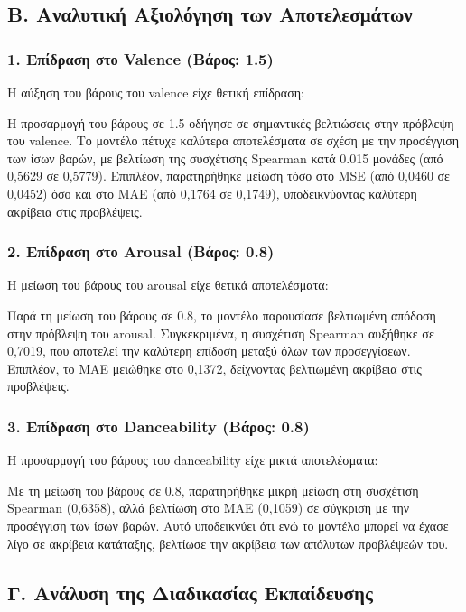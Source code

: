 \documentclass[a4paper,12pt]{article}
\begin{document}
\subsection*{Β. Αναλυτική Αξιολόγηση των Αποτελεσμάτων}

\subsubsection*{1. Επίδραση στο Valence (Βάρος: 1.5)}

Η αύξηση του βάρους του valence είχε θετική επίδραση:

Η προσαρμογή του βάρους σε 1.5 οδήγησε σε σημαντικές βελτιώσεις στην πρόβλεψη του valence. Το μοντέλο πέτυχε καλύτερα αποτελέσματα σε σχέση με την προσέγγιση των ίσων βαρών, με βελτίωση της συσχέτισης Spearman κατά 0.015 μονάδες (από 0,5629 σε 0,5779). Επιπλέον, παρατηρήθηκε μείωση τόσο στο MSE (από 0,0460 σε 0,0452) όσο και στο MAE (από 0,1764 σε 0,1749), υποδεικνύοντας καλύτερη ακρίβεια στις προβλέψεις.

\subsubsection*{2. Επίδραση στο Arousal (Βάρος: 0.8)}

Η μείωση του βάρους του arousal είχε θετικά αποτελέσματα:

Παρά τη μείωση του βάρους σε 0.8, το μοντέλο παρουσίασε βελτιωμένη απόδοση στην πρόβλεψη του arousal. Συγκεκριμένα, η συσχέτιση Spearman αυξήθηκε σε 0,7019, που αποτελεί την καλύτερη επίδοση μεταξύ όλων των προσεγγίσεων. Επιπλέον, το MAE μειώθηκε στο 0,1372, δείχνοντας βελτιωμένη ακρίβεια στις προβλέψεις.

\subsubsection*{3. Επίδραση στο Danceability (Βάρος: 0.8)}

Η προσαρμογή του βάρους του danceability είχε μικτά αποτελέσματα:

Με τη μείωση του βάρους σε 0.8, παρατηρήθηκε μικρή μείωση στη συσχέτιση Spearman (0,6358), αλλά βελτίωση στο MAE (0,1059) σε σύγκριση με την προσέγγιση των ίσων βαρών. Αυτό υποδεικνύει ότι ενώ το μοντέλο μπορεί να έχασε λίγο σε ακρίβεια κατάταξης, βελτίωσε την ακρίβεια των απόλυτων προβλέψεών του.

\subsection*{Γ. Ανάλυση της Διαδικασίας Εκπαίδευσης}
\end{document}
